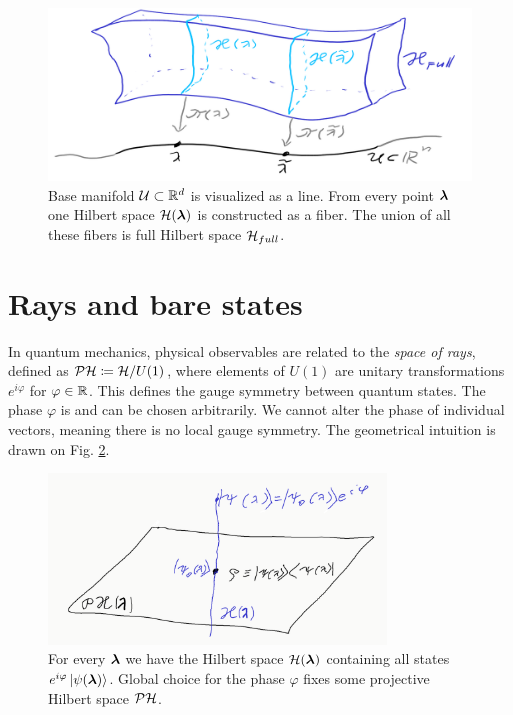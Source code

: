 \begin{figure}[H]
    \centering
    \includegraphics[width=\textwidth]{../img/manifold_basic_1.png}
\caption{Base manifold $\mathcal U\subset \mathbb{R}^d$ is visualized as a line. From every point ${\bm\lambda}$ one Hilbert space $\mathcal{H}({\bm\lambda})$ is constructed as a fiber. The union of all these fibers is full Hilbert space $\mathcal{H}_{full}$.}
    \label{fig:wholeBundle}
\end{figure}






\section{Rays and bare states}
In quantum mechanics, physical observables are related to the \emph{space of rays}, defined as $\mathcal{P}\mathcal{H}\coloneqq \mathcal{H}/U(1)$, where elements of $U(1)$ are unitary transformations $e^{i\varphi}$ for $\varphi\in\mathbb{R}$. This defines the  gauge symmetry between quantum states. The phase $\varphi$ is  and can be chosen arbitrarily. We cannot alter the phase of individual vectors, meaning there is no local gauge symmetry. The geometrical intuition is drawn on Fig. \ref{fig:projectiveHilbertSpace}.
\begin{figure}[H]
    \centering
    \includegraphics[width=0.8\textwidth]{../img/projectiveHilbertSpace.png}
\caption{For every ${\bm\lambda}$ we have the Hilbert space $\mathcal{H}({\bm\lambda})$ containing all states $e^{i\varphi}\ket{\psi({\bm\lambda})}$. Global choice for the phase $\varphi$ fixes some projective Hilbert space $\mathcal{P}\mathcal{H}$. }
    \label{fig:projectiveHilbertSpace}
\end{figure}

